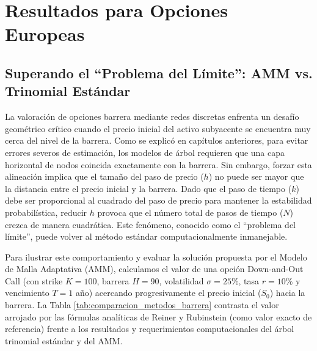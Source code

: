 \section{Resultados para Opciones Europeas}
\label{sec:resultados_europeas}

\subsection{Superando el ``Problema del Límite'': AMM vs. Trinomial Estándar}

La valoración de opciones barrera mediante redes discretas enfrenta un desafío geométrico crítico cuando el precio inicial del activo subyacente se encuentra muy cerca del nivel de la barrera. Como se explicó en capítulos anteriores, para evitar errores severos de estimación, los modelos de árbol requieren que una capa horizontal de nodos coincida exactamente con la barrera. Sin embargo, forzar esta alineación implica que el tamaño del paso de precio ($h$) no puede ser mayor que la distancia entre el precio inicial y la barrera. Dado que el paso de tiempo ($k$) debe ser proporcional al cuadrado del paso de precio para mantener la estabilidad probabilística, reducir $h$ provoca que el número total de pasos de tiempo ($N$) crezca de manera cuadrática. Este fenómeno, conocido como el ``problema del límite'', puede volver al método estándar computacionalmente inmanejable.

Para ilustrar este comportamiento y evaluar la solución propuesta por el Modelo de Malla Adaptativa (AMM), calculamos el valor de una opción Down-and-Out Call (con strike $K=100$, barrera $H=90$, volatilidad $\sigma=25\%$, tasa $r=10\%$ y vencimiento $T=1$ año) acercando progresivamente el precio inicial ($S_0$) hacia la barrera. La Tabla \ref{tab:comparacion_metodos_barrera} contrasta el valor arrojado por las fórmulas analíticas de Reiner y Rubinstein (como valor exacto de referencia) frente a los resultados y requerimientos computacionales del árbol trinomial estándar y del AMM.

